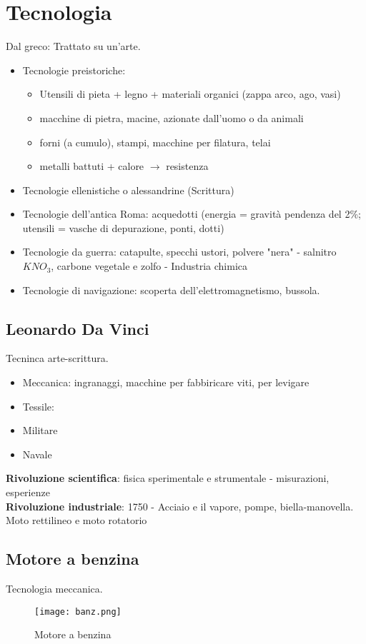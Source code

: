 \documentclass[../main.tex]{subfiles}
\begin{document}
\section{Tecnologia}
\begin{center}
    Dal greco: Trattato su un'arte.
\end{center}
\begin{itemize}
    \item Tecnologie preistoriche:
    \begin{itemize}
        \item Utensili di pieta + legno + materiali organici (zappa arco, ago, vasi)
        \item macchine di pietra, macine, azionate dall'uomo o da animali
        \item forni (a cumulo), stampi, macchine per filatura, telai
        \item metalli battuti + calore $\rightarrow$ resistenza
    \end{itemize}
    \item Tecnologie ellenistiche o alessandrine (Scrittura)
    \item Tecnologie dell'antica Roma: acquedotti (energia = gravità pendenza del 2\%; utensili = vasche di depurazione, ponti, dotti)
    \item Tecnologie da guerra: catapulte, specchi ustori, polvere "nera" - salnitro $KNO_3$, carbone vegetale e zolfo - Industria chimica
    \item Tecnologie di navigazione: scoperta dell'elettromagnetismo, bussola.
\end{itemize}
\subsection{Leonardo Da Vinci}
Tecninca arte-scrittura.
\begin{itemize}
    \item Meccanica: ingranaggi, macchine per fabbiricare viti, per levigare
    \item Tessile: 
    \item Militare
    \item Navale
\end{itemize}
\textbf{Rivoluzione scientifica}: fisica sperimentale e strumentale - misurazioni, esperienze\\
\textbf{Rivoluzione industriale}: 1750 - Acciaio e il vapore, pompe, biella-manovella. Moto rettilineo e moto rotatorio

\subsection{Motore a benzina}
Tecnologia meccanica.\\
\begin{figure}[h!]
    \centering
    \texttt{[image: banz.png]}
    \caption{Motore a benzina}
\end{figure}
\end{document}
